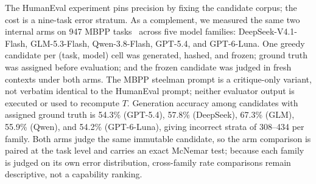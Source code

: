 \documentclass[a4paper,journal]{IAENGtran}
\begin{document}
The HumanEval experiment pins precision by fixing the candidate corpus; the cost is a
nine-task error stratum. As a complement, we measured the same two internal arms on 947
MBPP tasks~\cite{austin2021mbpp} across five model families: DeepSeek-V4.1-Flash,
GLM-5.3-Flash, Qwen-3.8-Flash, GPT-5.4, and GPT-6-Luna. One greedy candidate per
(task, model) cell was generated, hashed, and frozen; ground truth was assigned before
evaluation; and the frozen candidate was judged in fresh contexts under both arms. The
MBPP steelman prompt is a critique-only variant, not verbatim identical to the
HumanEval prompt; neither evaluator output is executed or used to recompute $T$.
Generation accuracy among candidates with assigned ground truth is 54.3\% (GPT-5.4),
57.8\% (DeepSeek), 67.3\% (GLM), 55.9\% (Qwen), and 54.2\% (GPT-6-Luna), giving
incorrect strata of 308--434 per family. Both arms judge the same immutable candidate,
so the arm comparison is paired at the task level and carries an exact McNemar test;
because each family is judged on its own error distribution, cross-family rate
comparisons remain descriptive, not a capability ranking.
\end{document}
